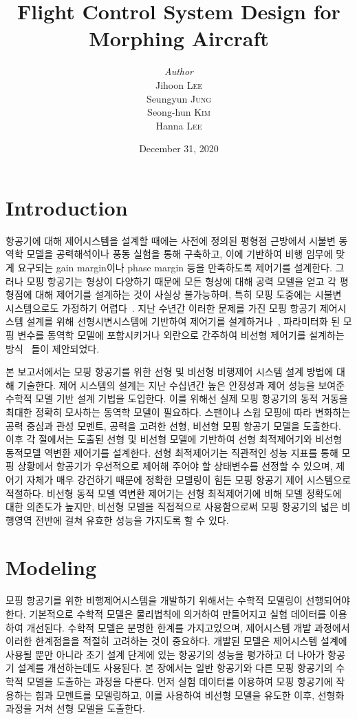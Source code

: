 \documentclass[a4paper, 12pt]{report}
\institute{Seoul National University}
\title{Flight Control System Design for Morphing Aircraft}
\author{\textit{Author}\\Jihoon \textsc{Lee}\\Seungyun \textsc{Jung}\\Seong-hun \textsc{Kim}\\Hanna \textsc{Lee}}
\date{December 31, 2020}
\begin{document}
	\maketitle
	\romantableofcontents

	\chapter{Introduction}
	항공기에 대해 제어시스템을 설계할 때에는 사전에 정의된 평형점 근방에서 시불변 동역학 모델을 공력해석이나 풍동 실험을 통해 구축하고, 이에 기반하여 비행 임무에 맞게 요구되는 gain margin이나 phase margin 등을 만족하도록 제어기를 설계한다.
	그러나 모핑 항공기는 형상이 다양하기 때문에 모든 형상에 대해 공력 모델을 얻고 각 평형점에 대해 제어기를 설계하는 것이 사실상 불가능하며, 특히 모핑 도중에는 시불변 시스템으로도 가정하기 어렵다~\cite{seigler_analysis_2009,chakravarthy_time-varying_2012}.
	지난 수년간 이러한 문제를 가진 모핑 항공기 제어시스템 설계를 위해  선형시변시스템에 기반하여 제어기를 설계하거나~\cite{jiang_systematic_2015,lee_linear_2019}, 파라미터화 된 모핑 변수를 동역학 모델에 포함시키거나 외란으로 간주하여 비선형 제어기를 설계하는 방식~\cite{wu_modified_2017,lee_neural_2019,jung_disturbance_2020} 들이 제안되었다.

	본 보고서에서는 모핑 항공기를 위한 선형 및 비선형 비행제어 시스템 설계 방법에 대해 기술한다.
	제어 시스템의 설계는 지난 수십년간 높은 안정성과 제어 성능을 보여준 수학적 모델 기반 설계 기법을 도입한다.
	이를 위해선 실제 모핑 항공기의 동적 거동을 최대한 정확히 모사하는 동역학 모델이 필요하다.
	스팬이나 스윕 모핑에 따라 변화하는 공력 중심과 관성 모멘트, 공력을 고려한 선형, 비선형 모핑 항공기 모델을 도출한다.
	이후 각 절에서는 도출된 선형 및 비선형 모델에 기반하여 선형 최적제어기와 비선형 동적모델 역변환 제어기를 설계한다.
	선형 최적제어기는 직관적인 성능 지표를 통해 모핑 상황에서 항공기가 우선적으로 제어해 주어야 할 상태변수를 선정할 수 있으며, 제어기 자체가 매우 강건하기 때문에 정확한 모델링이 힘든 모핑 항공기 제어 시스템으로 적절하다.
	비선형 동적 모델 역변환 제어기는 선형 최적제어기에 비해 모델 정확도에 대한 의존도가 높지만, 비선형 모델을 직접적으로 사용함으로써 모핑 항공기의 넓은 비행영역 전반에 걸쳐 유효한 성능을 가지도록 할 수 있다.



	\chapter{Modeling}

	모핑 항공기를 위한 비행제어시스템을 개발하기 위해서는 수학적 모델링이 선행되어야 한다. 
	기본적으로 수학적 모델은 물리법칙에 의거하여 만들어지고 실험 데이터를 이용하여 개선된다. 
	수학적 모델은 분명한 한계를 가지고있으며, 제어시스템 개발 과정에서 이러한 한계점을을 적절히 고려하는 것이 중요하다.
	개발된 모델은 제어시스템 설계에 사용될 뿐만 아니라 초기 설계 단계에 있는 항공기의 성능을 평가하고 더 나아가 항공기 설계를 개선하는데도 사용된다.
	본 장에서는 일반 항공기와 다른 모핑 항공기의 수학적 모델을 도출하는 과정을 다룬다.
	먼저 실험 데이터를 이용하여 모핑 항공기에 작용하는 힘과 모멘트를 모델링하고, 이를 사용하여 비선형 모델을 유도한 이후, 선형화 과정을 거쳐 선형 모델을 도출한다.
	
\end{document}
